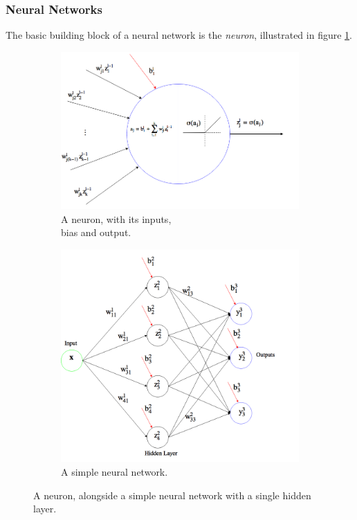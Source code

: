 \subsubsection{Neural Networks}
The basic building block of a neural network is the \textit{neuron}, illustrated in figure \ref{fig:neuron}.
\begin{figure}[H]
	\centering
	\begin{subfigure}[b]{.5\textwidth}
		\centering
		\includegraphics[width=\linewidth]{fig/neural.png}
		\caption{A neuron, with its inputs,\\ bias and output.}
		\label{fig:neuron}
	\end{subfigure}%
	\begin{subfigure}[b]{.5\textwidth}
		\centering
		\includegraphics[width=\linewidth]{fig/layers.png}
		\caption{A simple neural network.}
		\label{fig:layers}
	\end{subfigure}
	\caption{A neuron, alongside a simple neural network with a single hidden layer.}
	\label{fig:neural_net}
\end{figure}
